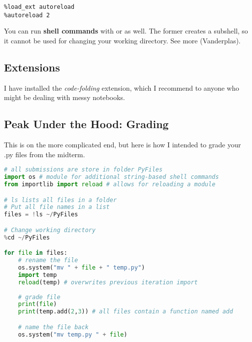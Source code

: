 \begin{lstlisting}
%load_ext autoreload
%autoreload 2
\end{lstlisting}



\smallskip
\noindent You can run \textbf{shell commands} with \code{!} or \code{\%} as well. The former creates a subshell, so it cannot be used for changing your working directory. See more  (Vanderplas). 




\subsection{Extensions}
I have installed the \emph{code-folding} extension, which I recommend to anyone who might be dealing with messy notebooks.



\subsection{Peak Under the Hood: Grading}

\noindent This is on the more complicated end, but here is how I intended to grade your .py files from the midterm.

\begin{lstlisting}[language = Python]
# all submissions are store in folder PyFiles
import os # module for additional string-based shell commands
from importlib import reload # allows for reloading a module

# ls lists all files in a folder
# Put all file names in a list
files = !ls ~/PyFiles

# Change working directory
%cd ~/PyFiles

for file in files:
    # rename the file 
    os.system("mv " + file + " temp.py")
    import temp
    reload(temp) # overwrites previous iteration import
    
    # grade file
    print(file)
    print(temp.add(2,3)) # all files contain a function named add

    # name the file back
    os.system("mv temp.py " + file)
\end{lstlisting}

